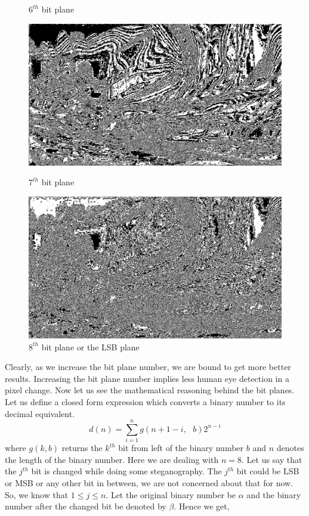\documentclass{report}
\begin{document}
\begin{figure}[H]
\begin{minipage}{0.46\linewidth}
\caption{$6^{th}$ bit plane}
\end{minipage}
\hfill
\begin{minipage}{0.46\linewidth}
\includegraphics[width=\textwidth]{images/7.png}
\caption{$7^{th}$ bit plane}
\end{minipage}
\hfill
\begin{minipage}{0.46\linewidth}
\includegraphics[width=\textwidth]{images/8.png}
\caption{$8^{th}$ bit plane or the LSB plane}
\end{minipage}

\end{figure}
Clearly, as we increase the bit plane number, we are bound to get more better results. Increasing the bit plane number implies less human eye detection in a pixel change. Now let us see the mathematical reasoning behind the bit planes. \newpage Let us define a closed form expression which converts a binary number to its decimal equivalent.
\begin{equation}
\displaystyle d(n) =\sum_{i=1}^{n}g(n+1-i,\textrm{ } b)2^{n-i}
\end{equation}
where $g(k, b)$ returns the $k^{th}$ bit from left of the binary number $b$ and $n$ denotes the length of the binary number. Here we are dealing with $n=8$. Let us say that the $j^{th}$ bit is changed while doing some steganography. The $j^{th}$ bit could be LSB or MSB or any other bit in between, we are not concerned about that for now. So, we know that $ 1 \leq j \leq n$. Let the original binary number be $\alpha$ and the binary number after the changed bit be denoted by $\beta$. Hence we get,
\end{document}
